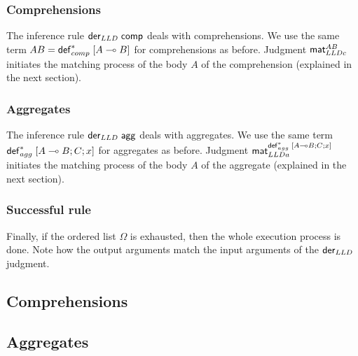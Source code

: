 

\subsubsection{Comprehensions}

The inference rule $\mathsf{der}_{LLD} \; \mathsf{comp}$ deals with comprehensions. We use the same
term \mbox{$AB = \mathsf{def}_{comp}^{*} \; [A \multimap B]$} for comprehensions as before.  Judgment $\mathsf{mat}_{LLDc}^{AB} \;$initiates the
matching process of the body $A$ of the comprehension (explained in the next
section).



\subsubsection{Aggregates}

The inference rule $\mathsf{der}_{LLD} \; \mathsf{agg}$ deals with aggregates. We use the same term
\mbox{$\mathsf{def}_{agg}^{*} \; [A \multimap B ; C; x]$} for aggregates as before. Judgment
$\mathsf{mat}_{LLDa}^{\mathsf{def}_{agg}^{*} \; [A \multimap B ; C; x]} \;$initiates the matching process of the body $A$ of the
aggregate (explained in the next section).



\subsubsection{Successful rule}

Finally, if the ordered list $\Omega$ is exhausted, then the whole execution
process is done.  Note how the output arguments match the input arguments of the
$\mathsf{der}_{LLD} \;$judgment.



\subsection{Comprehensions}


\subsection{Aggregates}


